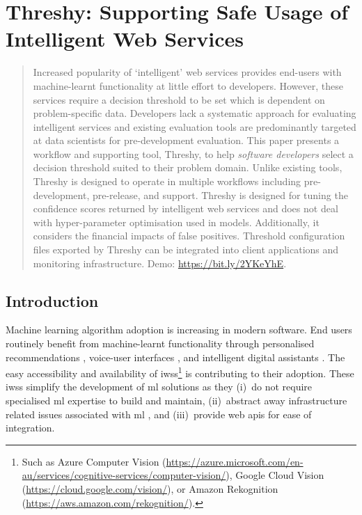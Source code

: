 \chapter[Supporting Safe Usage of Intelligent Web Services]
{Threshy: Supporting Safe Usage of Intelligent Web Services}
\label{ch:fse-demo2020}
\graphicspath{{mainmatter/publications/figures/fse-demo2020/}}

\def\demolink{https://bit.ly/2YKeYhE}
\def\demogooglelink{http://bit.ly/a2i2-threshy}

\glsresetall
\begin{abstract}
Increased popularity of `intelligent' web services provides end-users with machine-learnt functionality at little effort to developers. However, these services require a decision threshold to be set which is dependent on problem-specific data. Developers lack a systematic approach for evaluating intelligent services and existing evaluation tools are predominantly targeted at data scientists for pre-development evaluation. This paper presents a workflow and supporting tool, Threshy, to help \textit{software developers} select a decision threshold suited to their problem domain. Unlike existing tools, Threshy is designed to operate in multiple workflows including pre-development, pre-release, and support. Threshy is designed for tuning the confidence scores returned by intelligent web services and does not deal with hyper-parameter optimisation used in  models. Additionally, it considers the financial impacts of false positives.
Threshold configuration files exported by Threshy can be integrated into client applications and monitoring infrastructure. Demo: \url{\demolink}.
\end{abstract}
\glsresetall

\section{Introduction}

Machine learning algorithm adoption is increasing in modern software. End users routinely benefit from machine-learnt functionality through personalised recommendations \citep{covington2016deep}, voice-user interfaces \citep{myers2018patterns}, and intelligent digital assistants \citep{boyd2018just}. The easy accessibility and availability of \glspl{iws}\footnote{Such as Azure Computer Vision (\url{https://azure.microsoft.com/en-au/services/cognitive-services/computer-vision/}), Google Cloud Vision (\url{https://cloud.google.com/vision/}), or Amazon Rekognition (\url{https://aws.amazon.com/rekognition/}).} is contributing to their adoption. These \glspl{iws} simplify the development of \gls{ml} solutions as they (i)~do not require specialised \gls{ml} expertise to build and maintain, (ii)~abstract away infrastructure related issues associated with \gls{ml} \citep{Sculley2015, Arpteg2018}, and (iii)~provide web \glspl{api} for ease of integration. 

